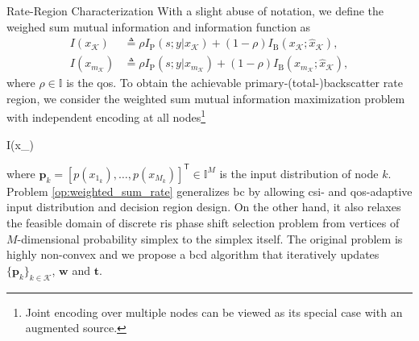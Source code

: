 \documentclass[journal]{IEEEtran}
\begin{document}
\begin{section}{Rate-Region Characterization}
	With a slight abuse of notation, we define the weighed sum mutual information and information function as
	\begin{align}
		I(x_{\mathcal{K}})
		 & \triangleq \rho I_{\text{P}}(s;y|x_{\mathcal{K}}) + (1 - \rho) I_{\text{B}}(x_{\mathcal{K}};\hat{x}_{\mathcal{K}}),\label{eq:weighted_sum_mutual_information}           \\
		I(x_{m_\mathcal{K}})
		 & \triangleq \rho I_{\text{P}}(s;y|x_{m_{\mathcal{K}}}) + (1 - \rho) I_{\text{B}}(x_{m_{\mathcal{K}}};\hat{x}_{\mathcal{K}}),\label{eq:weighted_sum_information_function}
	\end{align}
	where $\rho \in \mathbb{I}$ is the \gls{qos}.
	To obtain the achievable primary-(total-)backscatter rate region, we consider the weighted sum mutual information maximization problem with independent encoding at all nodes\footnote{Joint encoding over multiple nodes can be viewed as its special case with an augmented source.}
	\begin{maxi!}
		{}{I(x_{})}{\label{op:weighted_sum_rate}}{\label{ob:weighted_sum_rate}}
	\end{maxi!}
	where $\boldsymbol{p}_k = [p(x_{1_k}), \ldots, p(x_{M_k})]^\mathsf{T} \in \mathbb{I}^M$ is the input distribution of node $k$.
	Problem \eqref{op:weighted_sum_rate} generalizes \gls{bc} by allowing \gls{csi}- and \gls{qos}-adaptive input distribution and decision region design.
	On the other hand, it also relaxes the feasible domain of discrete \gls{ris} phase shift selection problem from vertices of $M$-dimensional probability simplex to the simplex itself.
	The original problem is highly non-convex and we propose a \gls{bcd} algorithm that iteratively updates $\{\boldsymbol{p}_k\}_{k \in \mathcal{K}}$, $\boldsymbol{w}$ and $\boldsymbol{t}$.


\end{section}
\end{document}
